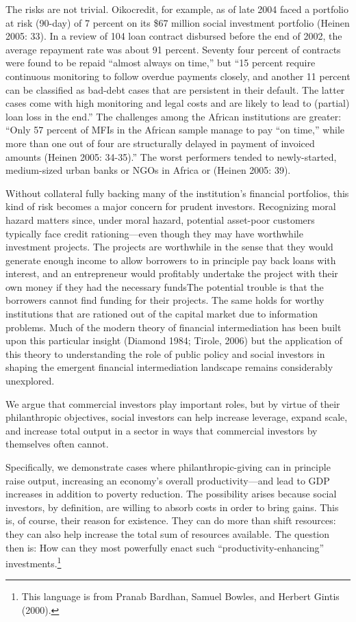 \documentclass{article}
\begin{document}
The risks are not trivial. Oikocredit, for example, as of late 2004
faced a portfolio at risk (90-day) of 7 percent on its \$67 million
social investment portfolio (Heinen 2005: 33). In a review of 104 loan
contract disbursed before the end of 2002, the average repayment rate
was about 91 percent. Seventy four percent of contracts were found to be
repaid ``almost always on time,'' but ``15 percent require continuous
monitoring to follow overdue payments closely, and another 11 percent
can be classified as bad-debt cases that are persistent in their
default. The latter cases come with high monitoring and legal costs and
are likely to lead to (partial) loan loss in the end.'' The challenges
among the African institutions are greater: ``Only 57 percent of MFIs in
the African sample manage to pay ``on time,'' while more than one out of
four are structurally delayed in payment of invoiced amounts (Heinen
2005: 34-35).'' The worst performers tended to newly-started,
medium-sized urban banks or NGOs in Africa or (Heinen 2005: 39).

Without collateral fully backing many of the institution's financial
portfolios, this kind of risk becomes a major concern for prudent
investors. Recognizing moral hazard matters since, under moral hazard,
potential asset-poor customers typically face credit rationing---even
though they may have worthwhile investment projects. The projects are
worthwhile in the sense that they would generate enough income to allow
borrowers to in principle pay back loans with interest, and an
entrepreneur would profitably undertake the project with their own money
if they had the necessary fundsThe potential trouble is that the
borrowers cannot find funding for their projects. The same holds for
worthy institutions that are rationed out of the capital market due to
information problems. Much of the modern theory of financial
intermediation has been built upon this particular insight (Diamond
1984; Tirole, 2006) but the application of this theory to understanding
the role of public policy and social investors in shaping the emergent
financial intermediation landscape remains considerably unexplored.

We argue that commercial investors play important roles, but by virtue
of their philanthropic objectives, social investors can help increase
leverage, expand scale, and increase total output in a sector in ways
that commercial investors by themselves often cannot.

Specifically, we demonstrate cases where philanthropic-giving can in
principle raise output, increasing an economy's overall
productivity---and lead to GDP increases in addition to poverty
reduction. The possibility arises because social investors, by
definition, are willing to absorb costs in order to bring gains. This
is, of course, their reason for existence. They can do more than shift
resources: they can also help increase the total sum of resources
available. The question then is: How can they most powerfully enact such
``productivity-enhancing'' investments.\footnote{This language is from
  Pranab Bardhan, Samuel Bowles, and Herbert Gintis (2000).}
\end{document}

